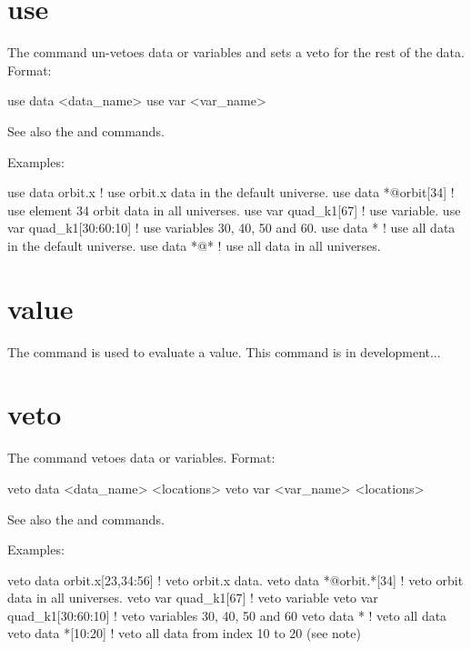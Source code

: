 {{{{{{%
\section{use}
\label{s:use}

The  command un-vetoes data or variables and sets a veto for the rest of the
data. Format:
\begin{example}
  use data  <data_name>
  use var <var_name>
\end{example}

\vskip 7pt 

See also the  and  commands.

Examples:
\begin{example}
  use data orbit.x             ! use orbit.x data in the default universe.
  use data *@orbit[34]         ! use element 34 orbit data in all universes.
  use var quad_k1[67]          ! use variable.
  use var quad_k1[30:60:10]    ! use variables 30, 40, 50 and 60.
  use data *                   ! use all data in the default universe.
  use data *@*                 ! use all data in all universes.
\end{example}

\section{value}
\label{s:value}

The  command is used to evaluate a value.  This command is in development...

\section{veto}
\label{s:veto}

The  command vetoes data or variables. Format:
\begin{example}
  veto data <data_name> <locations>
  veto var <var_name> <locations>
\end{example}

\vskip 7pt 

See also the  and  commands.

Examples:
\begin{example}
  veto data orbit.x[23,34:56]  ! veto orbit.x data.
  veto data *@orbit.*[34]      ! veto orbit data in all universes.
  veto var quad_k1[67]         ! veto variable
  veto var quad_k1[30:60:10]   ! veto variables 30, 40, 50 and 60
  veto data *                  ! veto all data
  veto data *[10:20]           ! veto all data from index 10 to 20 (see note)
\end{example}

}}}}}}
